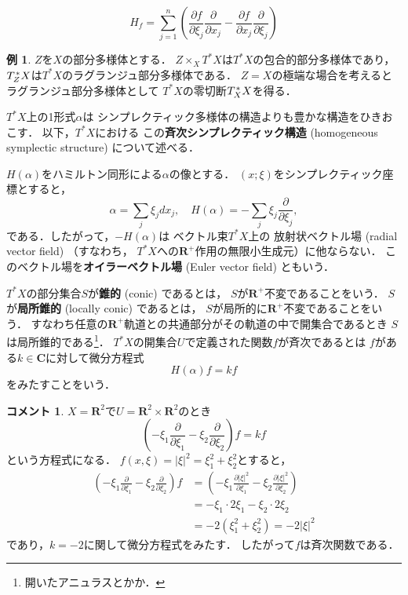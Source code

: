 \documentclass[leqno, 10pt, a4paper, dvipdfmx]{jsarticle}
\theoremstyle{definition}
\newcommand{\rr}{\mathbf{R}}
\newcommand{\cc}{\mathbf{C}}
\numberwithin{equation}{section}
\newcommand{\tpb}[1][]{\mathbin{\mathop{\times}\nolimits_{#1}}}
\theoremstyle{mystyle}
\newtheorem{EG}[AXM]{例}
\newtheorem*{CMT*}{コメント}
\newcommand{\cotb}[1][]{T^{\ast}{#1}}
\newcommand{\conm}[2][]{T_{#1}^{\hspace{0.7pt}\ast}{#2}}
\newcommand{\rrp}{\rr^{+}}
\begin{document}
\begin{equation}
    H_f=\sum_{j=1}^{n}\left(
        \frac{\partial f}{\partial\xi_j}
        \frac{\partial }{\partial x_j}
        -
        \frac{\partial f}{\partial x_j}
        \frac{\partial }{\partial\xi_j}
    \right)
\end{equation}

\begin{EG}
    \(Z\)を\(X\)の部分多様体とする．
    \(Z\tpb[X]\cotb[X]\)は\(\cotb[X]\)の包合的部分多様体であり，
    \(\conm[Z]{X}\)は\(\cotb[X]\)のラグランジュ部分多様体である．
    \(Z=X\)の極端な場合を考えるとラグランジュ部分多様体として
    \(\cotb[X]\)の零切断\(\conm[X]{X}\)を得る．
\end{EG}

\(\cotb[X]\)上の1形式\(\alpha\)は
シンプレクティック多様体の構造よりも豊かな構造をひきおこす．
以下，\(\cotb[X]\)における
この\textbf{斉次シンプレクティック構造} (homogeneous 
symplectic structure) について述べる．

\(H(\alpha)\)をハミルトン同形による\(\alpha\)の像とする．
\((x;\xi)\)をシンプレクティック座標とすると，
\begin{equation}
    \alpha=\sum_{j}^{}\xi_{j}dx_{j},
    \quad
    H(\alpha)=-\sum_{j}^{}\xi_{j}\frac{\partial}{\partial \xi_{j}},
\end{equation}
である．したがって，\(-H(\alpha)\)は
ベクトル束\(\cotb[X]\)上の
 放射状ベクトル場 (radial vector field) （すなわち，
\(\cotb[X]\)への\(\rrp\)作用の無限小生成元）に他ならない．
このベクトル場を\textbf{オイラーベクトル場} (Euler vector field) ともいう．

\(\cotb[X]\)の部分集合\(S\)が\textbf{錐的} (conic) であるとは，
\(S\)が\(\rrp\)不変であることをいう．
\(S\)が\textbf{局所錐的} (locally conic) であるとは，
\(S\)が局所的に\(\rrp\)不変であることをいう．
すなわち任意の\(\rrp\)軌道との共通部分がその軌道の中で開集合であるとき
\(S\)は局所錐的である\footnote{
    開いたアニュラスとかか．
}．
\(\cotb[X]\)の開集合\(U\)で定義された関数\(f\)が斉次であるとは
\(f\)がある\(k\in\cc\)に対して微分方程式
\[
    H(\alpha)f=kf
\]をみたすことをいう．
\begin{CMT*}
    \(X=\rr^2\)で\(U=\rr^2\times\rr^2\)のとき
    \[
        \left(
            -\xi_1\frac{\partial}{\partial \xi_{1}}
            -\xi_2\frac{\partial}{\partial \xi_{2}}
        \right)f=kf
    \]
    という方程式になる．
    \(f(x,\xi)=\left|\xi\right|^2=\xi_{1}^{2}+\xi_{2}^{2}\)とすると，
    \begin{align*}
        \left(
            -\xi_1\frac{\partial}{\partial \xi_{1}}
            -\xi_2\frac{\partial}{\partial \xi_{2}}
        \right)f
        &=\left(
            -\xi_1\frac{\partial \left|\xi\right|^2}{\partial \xi_{1}}
            -\xi_2\frac{\partial \left|\xi\right|^2}{\partial \xi_{2}}
        \right)\\
        &=-\xi_1\cdot 2\xi_1-\xi_2\cdot 2\xi_2\\
        &=-2(\xi_1^2+\xi_2^2)=-2 \left|\xi\right|^2
    \end{align*}
    であり，\(k=-2\)に関して微分方程式をみたす．
    したがって\(f\)は斉次関数である．
\end{CMT*}
\end{document}
